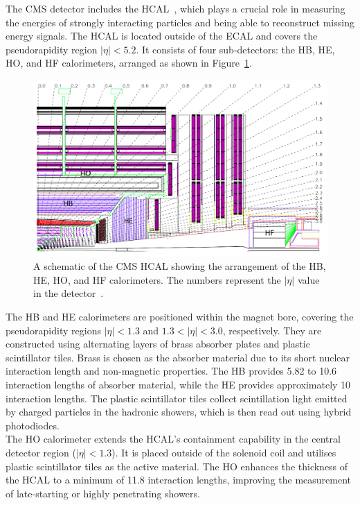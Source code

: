 The \ac{CMS} detector includes the \ac{HCAL}~\cite{CMS_Setup,USCMS:2009fxn}, which plays a crucial role in measuring the energies of strongly interacting particles and being able to reconstruct missing energy signals. 
The \ac{HCAL} is located outside of the \ac{ECAL} and covers the pseudorapidity region $|\eta| < 5.2$. 
It consists of four sub-detectors: the \ac{HB}, \ac{HE}, \ac{HO}, and \ac{HF} calorimeters, arranged as shown in Figure~\ref{fig:hcal}. \\

\begin{figure}[!hbtp]
    \centering
    \includegraphics[width=\textwidth]{Figures/HCAL.png}
    \caption[Diagram of the CMS HCAL.]{A schematic of the CMS HCAL showing the arrangement of the HB, HE, HO, and HF calorimeters. The numbers represent the $|\eta|$ value in the detector~\cite{CMS_Setup}.}
    \label{fig:hcal}
\end{figure}

The \ac{HB} and \ac{HE} calorimeters are positioned within the magnet bore, covering the pseudorapidity regions $|\eta| < 1.3$ and $1.3 < |\eta| < 3.0$, respectively. 
They are constructed using alternating layers of brass absorber plates and plastic scintillator tiles. 
Brass is chosen as the absorber material due to its short nuclear interaction length and non-magnetic properties. 
The \ac{HB} provides 5.82 to 10.6 interaction lengths of absorber material, while the \ac{HE} provides approximately 10 interaction lengths. 
The plastic scintillator tiles collect scintillation light emitted by charged particles in the hadronic showers, which is then read out using hybrid photodiodes. \\

The \ac{HO} calorimeter extends the \ac{HCAL}'s containment capability in the central detector region ($|\eta| < 1.3$).
It is placed outside of the solenoid coil and utilises plastic scintillator tiles as the active material. 
The \ac{HO} enhances the thickness of the \ac{HCAL} to a minimum of 11.8 interaction lengths, improving the measurement of late-starting or highly penetrating showers. \\

